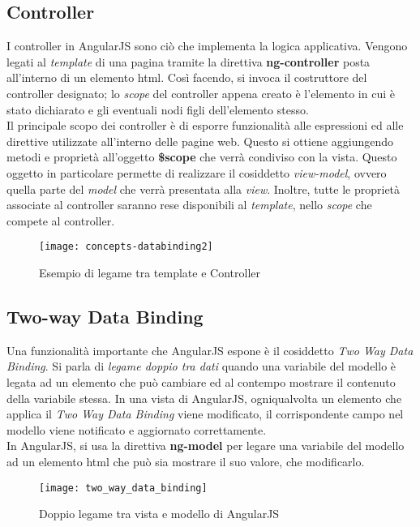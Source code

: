 \subsection{Controller}
I controller in AngularJS sono ciò che implementa la logica applicativa. Vengono legati al \emph{template} di una pagina tramite la direttiva \textbf{ng-controller} posta all'interno di un elemento \gls{html}. Così facendo, si invoca il costruttore del controller designato; lo \emph{scope} del controller appena creato è l'elemento in cui è stato dichiarato e gli eventuali nodi figli dell'elemento stesso.\\
Il principale scopo dei controller è di esporre funzionalità alle espressioni ed alle direttive utilizzate all'interno delle pagine web. Questo si ottiene aggiungendo metodi e proprietà all'oggetto \textbf{\$scope} che verrà condiviso con la vista. Questo oggetto in particolare permette di realizzare il cosiddetto \emph{view-model}, ovvero quella parte del \emph{model} che verrà presentata alla \emph{view}. Inoltre, tutte le proprietà associate al controller saranno rese disponibili al \emph{template}, nello \emph{scope} che compete al controller.

\begin{figure}[!h] 
    \centering 
    \texttt{[image: concepts-databinding2]} 
    \caption{Esempio di legame tra template e Controller}
\end{figure}

\subsection{Two-way Data Binding}
Una funzionalità importante che AngularJS espone è il cosiddetto \emph{Two Way Data Binding}. Si parla di \emph{legame doppio tra dati} quando una variabile del modello è legata ad un elemento che può cambiare ed al contempo mostrare il contenuto della variabile stessa. In una vista di AngularJS, ogniqualvolta un elemento che applica il \emph{Two Way Data Binding} viene modificato, il corrispondente campo nel modello viene notificato e aggiornato correttamente.\\
In AngularJS, si usa la direttiva \textbf{ng-model} per legare una variabile del modello ad un elemento \gls{html} che può sia mostrare il suo valore, che modificarlo.

\begin{figure}[H] 
    \centering 
    \texttt{[image: two\_way\_data\_binding]} 
    \caption{Doppio legame tra vista e modello di AngularJS}
\end{figure}

